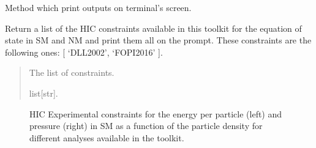 \documentclass[letterpaper,10pt,english]{sphinxmanual}
\begin{document}
\begin{fulllineitems}
\begin{fulllineitems}
\end{fulllineitems}


\begin{fulllineitems}
\label{\detokenize{source/api/setup_eos_hic:nucleardatapy.setup_eos_hic.SetupEOSHIC.print_outputs}}
\pysigstartsignatures
\pysiglinewithargsret
{}
{}
{}
\pysigstopsignatures
\sphinxAtStartPar
Method which print outputs on terminal’s screen.

\end{fulllineitems}


\end{fulllineitems}


\begin{fulllineitems}
\label{\detokenize{source/api/setup_eos_hic:nucleardatapy.setup_eos_hic.eos_hic_constraints}}
\pysigstartsignatures
\pysiglinewithargsret
{}
{}
{}
\pysigstopsignatures
\sphinxAtStartPar
Return a list of the HIC constraints available in this toolkit
for the equation of state in SM and NM and print them all on
the prompt. These constraints are the following
ones: {[} ‘DLL\sphinxhyphen{}2002’, ‘FOPI\sphinxhyphen{}2016’ {]}.
\begin{quote}\begin{description}
\sphinxAtStartPar
The list of constraints.

\sphinxAtStartPar
list{[}str{]}.

\end{description}\end{quote}

\end{fulllineitems}


\begin{figure}[htbp]
\centering
\capstart

\noindent{}
\caption{HIC Experimental constraints for the energy per particle (left) and pressure (right) in SM as a function of the particle density for different analyses available in the  toolkit.}\label{\detokenize{source/api/setup_eos_hic:id1}}\end{figure}
\end{document}
